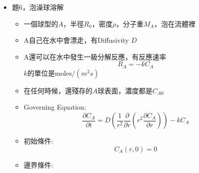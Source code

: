 \documentclass[../main.tex]{subfiles}
\begin{document}
\begin{itemize}
\begin{enumerate}
\begin{equation}
      \qquad \theta(z^\ast,0)=0
    \end{equation}
    邊界條件為
    \begin{equation}
      \theta_{z^\ast}(1,t^\ast)=-1,\qquad \theta_{z^\ast}(-1,t^\ast)=+1.
    \end{equation}
    \item 當 $t\to\infty$ 時，假設
    \begin{equation}
      \theta(z^\ast,t^\ast)=C_0 t^\ast+\psi(z^\ast)
    \end{equation}
    代入 PDE 得
    \begin{equation}
      C_0=\psi''(z^\ast).
    \end{equation}
    積分：
    \begin{equation}
      \psi'(z^\ast)=C_0 z^\ast+C_1.
    \end{equation}
    由邊界 $\psi'(1)=-1,\ \psi'(-1)=+1$ 得
    \begin{equation}
      \boxed{C_0=-1,\qquad C_1=0}
    \end{equation}
    再積分：
    \begin{equation}
      \boxed{\psi(z^\ast)=-\frac{1}{2}z^{\ast2}+C_2}
    \end{equation}
  \end{enumerate}
  \item 題6，泡澡球溶解
  \begin{itemize}
    \item 一個球型的$A$，半徑$R_0$，密度$\rho$，分子重$M_A$，泡在流體裡
    \item A自己在水中會漂走，有Diffusivity $D$
    \item A還可以在水中發生一級分解反應，有反應速率
    \begin{equation}
      R_A = -kC_A
    \end{equation}
    $k$的單位是$\text{moles}/(m^2s)$
    \item 在任何時候，還殘存的$A$球表面，濃度都是$C_{A0}$
    \item Governing Equation:
    \begin{equation}
      \frac{\partial C_A}{\partial t} = D \left(
        \frac{1}{r^2}\frac{\partial}{\partial r} \left(
          r^2 \frac{\partial C_A}{\partial r}
        \right)
      \right) - k C_A
    \end{equation}
    \item 初始條件:
    \begin{equation}
      C_A(r,0) = 0
    \end{equation}
    \item 邊界條件:

\end{itemize}
\end{itemize}
\end{document}

